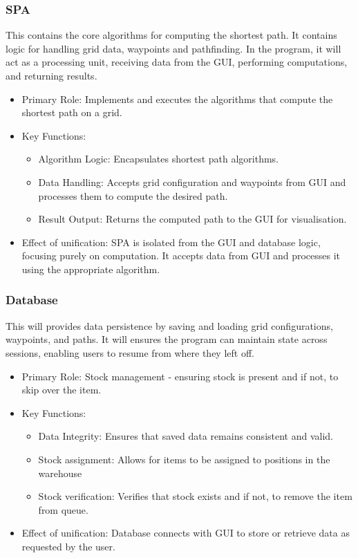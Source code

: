 \subsubsection{SPA}
This contains the core algorithms for computing the shortest path. It contains logic for handling grid data, waypoints and pathfinding. In the program, it will act as a processing unit, receiving data from the GUI, performing computations, and returning results.

\begin{itemize}
    \item Primary Role: Implements and executes the algorithms that compute the shortest path on a grid.
    \item Key Functions:
        \begin{itemize}
            \item Algorithm Logic: Encapsulates shortest path algorithms.
            \item Data Handling: Accepts grid configuration and waypoints from GUI and processes them to compute the desired path.
            \item Result Output: Returns the computed path to the GUI for visualisation.
        \end{itemize}
    \item Effect of unification: \newline
        SPA is isolated from the GUI and database logic, focusing purely on computation. It accepts data from GUI and processes it using the appropriate algorithm.
\end{itemize}



\subsubsection{Database}
This will provides data persistence by saving and loading grid configurations, waypoints, and paths. It will ensures the program can maintain state across sessions, enabling users to resume from where they left off.

\begin{itemize}
    \item Primary Role: Stock management - ensuring stock is present and if not, to skip over the item.
    \item Key Functions:
        \begin{itemize}
            \item Data Integrity: Ensures that saved data remains consistent and valid.
            \item Stock assignment: Allows for items to be assigned to positions in the warehouse
            \item Stock verification: Verifies that stock exists and if not, to remove the item from queue.
        \end{itemize}
    \item Effect of unification: \newline
        Database connects with GUI to store or retrieve data as requested by the user.
\end{itemize}


